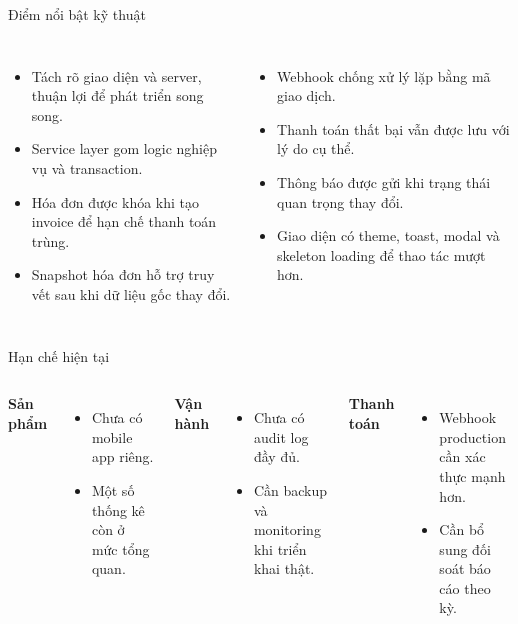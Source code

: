\documentclass[t, aspectratio=169]{beamer}
\begin{document}
\begin{frame}{Điểm nổi bật kỹ thuật}
\begin{columns}[T,onlytextwidth]
\begin{itemize}
  \item Tách rõ giao diện và server, thuận lợi để phát triển song song.
  \item Service layer gom logic nghiệp vụ và transaction.
  \item Hóa đơn được khóa khi tạo invoice để hạn chế thanh toán trùng.
  \item Snapshot hóa đơn hỗ trợ truy vết sau khi dữ liệu gốc thay đổi.
\end{itemize}
\begin{itemize}
  \item Webhook chống xử lý lặp bằng mã giao dịch.
  \item Thanh toán thất bại vẫn được lưu với lý do cụ thể.
  \item Thông báo được gửi khi trạng thái quan trọng thay đổi.
  \item Giao diện có theme, toast, modal và skeleton loading để thao tác mượt hơn.
\end{itemize}
\end{columns}
\end{frame}

\begin{frame}{Hạn chế hiện tại}
\begin{columns}[T,onlytextwidth]
\textbf{\textcolor{hustprimary}{Sản phẩm}}
\begin{itemize}
  \item Chưa có mobile app riêng.
  \item Một số thống kê còn ở mức tổng quan.
\end{itemize}
\textbf{\textcolor{hustprimary}{Vận hành}}
\begin{itemize}
  \item Chưa có audit log đầy đủ.
  \item Cần backup và monitoring khi triển khai thật.
\end{itemize}
\textbf{\textcolor{hustprimary}{Thanh toán}}
\begin{itemize}
  \item Webhook production cần xác thực mạnh hơn.
  \item Cần bổ sung đối soát báo cáo theo kỳ.
\end{itemize}
\end{columns}
\end{frame}
\end{document}
